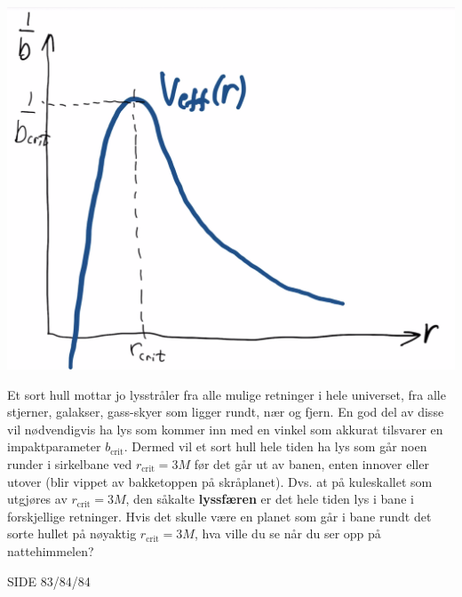 \documentclass{beamer}
\newcommand{\pagebutton}[1]{\setbeamertemplate{button}{\tikz\node[inner xsep = 5pt, draw = structure!90, fill = green(ryb), rounded corners = 8pt]{\color{amber}\Large\insertbuttontext};}\beamerbutton{#1}}
\begin{document}
\begin{frame}
{
\centerline{\includegraphics[scale=0.1]{media/skraplan9.png}}
Et sort hull mottar jo lysstråler fra alle mulige retninger i hele universet, fra alle stjerner, galakser, gass-skyer som ligger rundt, nær og fjern. En god del av disse vil nødvendigvis ha lys som kommer inn med en vinkel som akkurat tilsvarer en impaktparameter $b_\mathrm{crit}$. Dermed vil et sort hull hele tiden ha lys som går noen runder i sirkelbane ved $r_\mathrm{crit}=3M$ før det går ut av banen, enten innover eller utover (blir vippet av bakketoppen på skråplanet). Dvs. at på kuleskallet som utgjøres av $r_\mathrm{crit}=3M$, den såkalte {\bf lyssfæren} er det hele tiden lys i bane i forskjellige retninger. Hvis det skulle være en planet som går i bane rundt det sorte hullet på nøyaktig $r_\mathrm{crit}=3M$, hva ville du se når du ser opp på nattehimmelen?
\hyperlink{skra47}{\pagebutton{SIDE 82/84/84}}}

{
\huge{}}{SIDE 83/84/84}



\end{frame}
\end{document}
